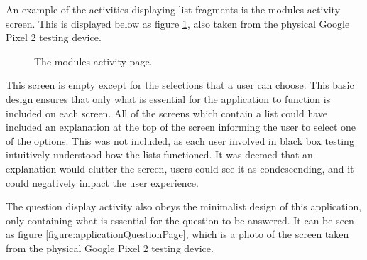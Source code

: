 \documentclass{article}
\begin{document}
An example of the activities displaying list fragments is the modules activity screen. This is displayed below as figure \ref{figure:applicationModulesPage}, also taken from the physical Google Pixel 2 testing device. 

\begin{figure}[H]
	\centering
	\caption{The modules activity page.}
	\label{figure:applicationModulesPage}
\end{figure}

This screen is empty except for the selections that a user can choose. This basic design ensures that only what is essential for the application to function is included on each screen. All of the screens which contain a list could have included an explanation at the top of the screen informing the user to select one of the options. This was not included, as each user involved in black box testing intuitively understood how the lists functioned. It was deemed that an explanation would clutter the screen, users could see it as condescending, and it could negatively impact the user experience. \par

The question display activity also obeys the minimalist design of this application, only containing what is essential for the question to be answered. It can be seen as figure \ref{figure:applicationQuestionPage}, which is a photo of the screen taken from the physical Google Pixel 2 testing device.
\end{document}
